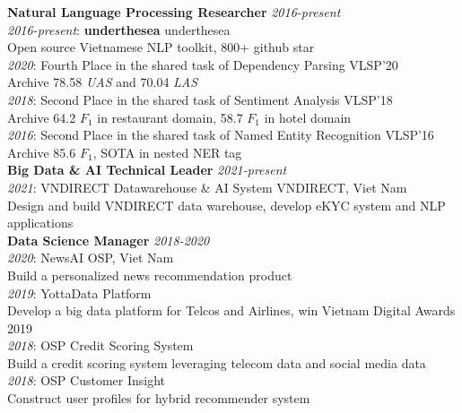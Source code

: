 \documentclass[11pt,a4paper,roman]{article}
\begin{document}
\noindent
\textbf{Natural Language Processing Researcher}
\hfill
\textit{2016-present}
\\
\textit{2016-present}: \textbf{underthesea}
\hfill
underthesea
\\\noindent
Open source Vietnamese NLP toolkit, 800+ github star
\\
\textit{2020}: Fourth Place in the shared task of Dependency Parsing VLSP'20
\\
Archive 78.58 \textit{UAS} and 70.04 \textit{LAS}
\\
\textit{2018}: Second Place in the shared task of Sentiment Analysis VLSP'18
\\
Archive 64.2 $F_{1}$ in restaurant domain, 58.7 $F_{1}$ in hotel domain
\\
\textit{2016}: Second Place in the shared task of Named Entity Recognition VLSP'16
\\
Archive 85.6 $F_{1}$, SOTA in nested NER tag
\\

\noindent
\textbf{Big Data \& AI Technical Leader}
\hfill
\textit{2021-present}
\\
\textit{2021}: VNDIRECT Datawarehouse \& AI System
\hfill
VNDIRECT, Viet Nam
\\
Design and build VNDIRECT data warehouse, develop eKYC system and NLP applications
\\

\noindent
\textbf{Data Science Manager}
\hfill
\textit{2018-2020}
\\
\textit{2020}: NewsAI
\hfill
OSP, Viet Nam
\\
Build a personalized news recommendation product
\\
\textit{2019}: YottaData Platform
\\
Develop a big data platform for Telcos and Airlines, win Vietnam Digital Awards 2019
\\
\textit{2018}: OSP Credit Scoring System
\\
Build a credit scoring system leveraging telecom data and social media data
\\
\textit{2018}: OSP Customer Insight
\\
Construct user profiles for hybrid recommender system
\\
\end{document}
